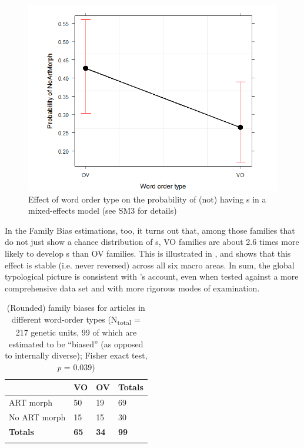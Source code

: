 \documentclass[output=paper]{langsci/langscibook}
\begin{document}
  

\begin{figure}
\includegraphics[height=.3\textheight]{figures/schmidtkebode-img2.png}
\caption{Effect of word order type on the probability of (not) having s in a mixed-effects model (see SM3 for details)}
\label{fig:ksb:2}
\end{figure}

In the Family Bias estimations, too, it turns out that, among those families that do not just show a chance distribution of s, VO families are about 2.6 times more likely to develop s than OV families. This is illustrated in , and  shows that this effect is stable (i.e. never reversed) across all six macro areas. In sum, the global typological picture is consistent with ’s  account, even when tested against a more comprehensive data set and with more rigorous modes of examination.
 

\begin{table}
\begin{tabularx}{.8\textwidth}{lYYY}
\lsptoprule
& VO &   OV &   Totals\\
\midrule 
ART morph & 50 & 19 & 69\\
No ART morph & 15 & 15 & 30\\
\midrule
\textbf{Totals} & \textbf{65} & \textbf{34} & \textbf{99}\\
\lspbottomrule
\end{tabularx} 
\caption{(Rounded) family biases for articles in different word-order types (N\textsubscript{total} = 217 genetic units, 99 of which are estimated to be “biased” (as opposed to internally diverse); Fisher exact test, \textit{p} = 0.039)}
\label{tab:ksb:3}
\end{table}
   
\end{document}
